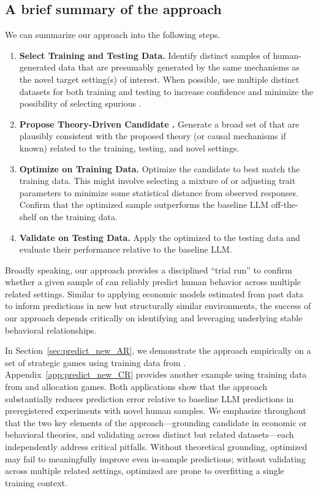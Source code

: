 \subsection{A brief summary of the approach}

We can summarize our approach into the following steps.

\begin{enumerate}[itemsep=1pt, topsep=0pt]
\item \textbf{Select Training and Testing Data.} Identify distinct samples of human-generated data that are presumably generated by the same mechanisms as the novel target setting(s) of interest. 
When possible, use multiple distinct datasets for both training and testing to increase confidence and minimize the possibility of selecting spurious .
\item \textbf{Propose Theory-Driven Candidate .} Generate a broad set of  that are plausibly consistent with the proposed theory (or causal mechanisms if known) related to the training, testing, and novel settings.
\item \textbf{Optimize  on Training Data.} Optimize the candidate  to best match the training data. 
This might involve selecting a mixture of  or adjusting trait parameters to minimize some statistical distance from observed responses.
Confirm that the optimized sample outperforms the baseline LLM off-the-shelf on the training data.
\item \textbf{Validate  on Testing Data.} Apply the optimized  to the testing data and evaluate their performance relative to the baseline LLM.
\end{enumerate}

Broadly speaking, our approach provides a disciplined ``trial run'' to confirm whether a given sample of  can reliably predict human behavior across multiple related settings.
Similar to applying economic models estimated from past data to inform predictions in new but structurally similar environments, the success of our approach depends critically on identifying and leveraging underlying stable behavioral relationships.

In Section~\ref{sec:predict_new_AR}, we demonstrate the approach empirically on a set of strategic games using training data from \cite{1120Arad2012}.
Appendix~\ref{app:predict_new_CR} provides another example using training data from \citep{charness2002understanding} and allocation games.
Both applications show that the approach substantially reduces prediction error relative to baseline LLM predictions in preregistered experiments with novel human samples.
We emphasize throughout that the two key elements of the approach---grounding candidate  in economic or behavioral theories, and validating across distinct but related datasets---each independently address critical pitfalls.
Without theoretical grounding, optimized  may fail to meaningfully improve even in-sample predictions; without validating across multiple related settings, optimized  are prone to overfitting a single training context.
